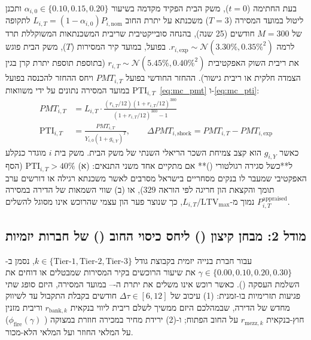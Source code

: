 בעת החתימה ($t=0$), משק הבית הפקיד מקדמה בשיעור $\alpha_{i,0} \in \{0.10, 0.15, 0.20\}$ ותכנן ליטול במועד המסירה ($T=3$) משכנתא על יתרת החוב $L_{i,T} = \left(1 - \alpha_{i,0}\right)P_{i,\text{nom}}$ לתקופה של $M = 300$ חודשים (\num{25} שנה), בהנחה סובייקטיבית שריבית המשכנתאות המשוקללת תרד לרמה $r_{i,\text{exp}} \sim \mathcal{N}\left(3.30\%, 0.35\%^2\right)$. בפועל, במועד קיר המסירות ($T$), משק הבית פוגש את ריבית השוק האפקטיבית $r_{i,T} \sim \mathcal{N}\left(5.45\%, 0.40\%^2\right)$ (בתוספת תוספת יתרת קרן בגין הצמדה חלקית או ריבית גישור). ההחזר החודשי בפועל $PMT_{i,T}$ ויחס ההחזר להכנסה בפועל $\text{PTI}_{i,T}$ במועד המסירה נתונים על ידי משוואות~\eqref{eq:mc_pmt} ו-\eqref{eq:mc_pti}:
\begin{align}
\label{eq:mc_pmt}
PMT_{i,T} &= L_{i,T} \cdot \frac{\left(r_{i,T}/12\right)\left(1 + r_{i,T}/12\right)^{300}}{\left(1 + r_{i,T}/12\right)^{300} - 1} \\
\label{eq:mc_pti}
\text{PTI}_{i,T} &= \frac{PMT_{i,T}}{Y_{i,0}\left(1 + g_{i,Y}\right)^T}, \qquad \Delta PMT_{i,\text{shock}} = PMT_{i,T} - PMT_{i,\text{exp}}
\end{align}
כאשר $g_{i,Y}$ הוא קצב צמיחת השכר הריאלי השנתי של משק הבית. משק בית $i$ מוגדר כנקלע ל**כשל סגירה רגולטורי ()** אם מתקיים אחד משני התנאים: (א) $\text{PTI}_{i,T} > 40\%$ (הסף האפקטיבי שמעבר לו בנקים מסחריים בישראל מסרבים לאשר משכנתא רגילה או דורשים ערב תומך והקצאת הון חריגה לפי הוראה \num{329}), או (ב) שווי השמאות של הדירה במסירה $P_{i,T}^{\text{appraised}}$ נמוך מ-$L_{i,T} / \text{LTV}_{\max}$, כך שנוצר פער הון עצמי שהרוכש אינו מסוגל להשלים.

\subsection{מודל 2: מבחן קיצון () ליחס כיסוי החוב () של חברות יזמיות}
עבור חברת בנייה יזמית בקבוצת גודל $k \in \{\text{Tier-1}, \text{Tier-2}, \text{Tier-3}\}$, נסמן ב-$\gamma \in \{0.00, 0.10, 0.20, 0.30\}$ את שיעור הרוכשים בקיר המסירות שמבטלים או דוחים את השלמת העסקה (). כאשר רוכש אינו משלים את יתרת ה--- במועד המסירה, היזם סופג שתי פגיעות תזרימיות בו-זמנית: (1) עיכוב של $\Delta\tau \in [6, 12]$ חודשים בקבלת התקבול עד לשיווק מחדש של הדירה, שבמהלכם היזם ממשיך לשלם ריבית ליווי בנקאית $r_{\text{bank},k}$ וריבית מזנין חוץ-בנקאית $r_{\text{mezz},k}$ על החוב הפתוח; ו-(2) ירידת מחיר במכירה חוזרת במצוקה ( $\phi_{\text{fire}}(\gamma)$) על המלאי החוזר ועל המלאי הלא-מכור.


